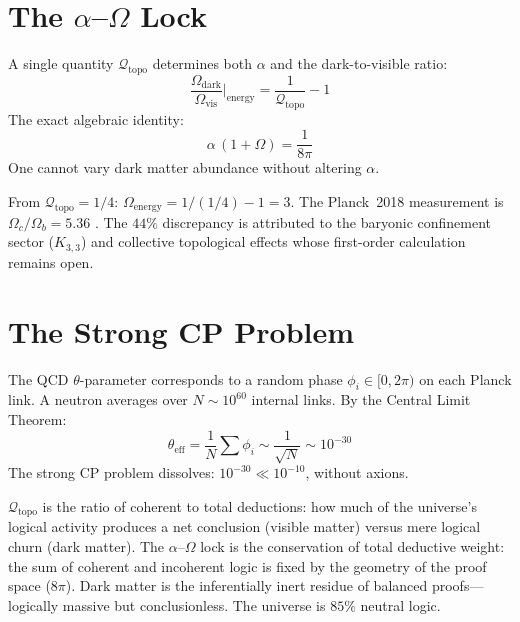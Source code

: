 \documentclass[11pt, a4paper, openany]{book}
\newcounter{thm}[chapter]
\begin{document}
\section{The $\alpha$--$\Omega$ Lock}\label{sec:alpha-omega}

\begin{theorem}\label{thm:alpha-omega}
A single quantity $\mathcal{Q}_{\mathrm{topo}}$ determines both $\alpha$ and the dark-to-visible ratio:
\begin{equation}
  \frac{\Omega_{\mathrm{dark}}}{\Omega_{\mathrm{vis}}}\bigg|_{\!\mathrm{energy}}
  = \frac{1}{\mathcal{Q}_{\mathrm{topo}}} - 1
\end{equation}
The exact algebraic identity:
\[
  \boxed{\;\alpha\,(1 + \Omega) = \frac{1}{8\pi}\;}
\]
One cannot vary dark matter abundance without altering $\alpha$.
\end{theorem}

\noindent
From $\mathcal{Q}_{\mathrm{topo}} = 1/4$:
$\Omega_{\mathrm{energy}} = 1/(1/4) - 1 = 3$.
The Planck~2018 measurement is $\Omega_c/\Omega_b = 5.36$
\cite{planck2018}. The $44\%$ discrepancy is attributed to the
baryonic confinement sector ($K_{3,3}$) and collective topological
effects whose first-order calculation remains open.

\section{The Strong CP Problem}\label{sec:cp}

The QCD $\theta$-parameter corresponds to a random phase $\phi_i \in [0, 2\pi)$ on each Planck link. A neutron averages over $N \sim 10^{60}$ internal links. By the Central Limit Theorem:
\[
  \theta_{\mathrm{eff}} = \frac{1}{N}\sum\phi_i \sim \frac{1}{\sqrt{N}} \sim 10^{-30}
\]
The strong CP problem dissolves: $10^{-30} \ll 10^{-10}$, without axions.

\begin{logicalreading}
$\mathcal{Q}_{\mathrm{topo}}$ is the ratio of coherent to total deductions: how much of the universe's logical activity produces a net conclusion (visible matter) versus mere logical churn (dark matter). The $\alpha$--$\Omega$ lock is the conservation of total deductive weight: the sum of coherent and incoherent logic is fixed by the geometry of the proof space ($8\pi$). Dark matter is the inferentially inert residue of balanced proofs---logically massive but conclusionless. The universe is $85\%$ neutral logic.
\end{logicalreading}
\end{document}

